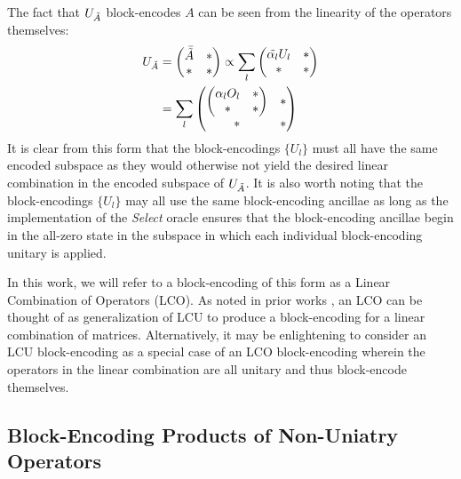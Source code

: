 The fact that $U_{\Tilde{A}}$ block-encodes $A$ can be seen from the linearity of the operators themselves:
\begin{equation}
    \begin{split}
        U_{\Tilde{A}} &= 
        \begin{pmatrix}
        \bar{\Tilde{A}} & * \\
        * & * 
        \end{pmatrix} \propto
        \sum_{l}
        \begin{pmatrix}
        \Tilde{\alpha_l} U_l & * \\
        * & * 
        \end{pmatrix} \\
        & =\sum_{l}
        \begin{pmatrix}
        \begin{pmatrix}
            \alpha_l O_l & * \\
            * & * 
        \end{pmatrix} & * \\
        * & * 
        \end{pmatrix} 
    \end{split}
\end{equation}
It is clear from this form that the block-encodings $\{U_l\}$ must all have the same encoded subspace as they would otherwise not yield the desired linear combination in the encoded subspace of $U_{\Tilde{A}}$.
It is also worth noting that the block-encodings $\{U_l\}$ may all use the same block-encoding ancillae as long as the implementation of the \textit{Select} oracle ensures that the block-encoding ancillae begin in the all-zero state in the subspace in which each individual block-encoding unitary is applied.

In this work, we will refer to a block-encoding of this form as a Linear Combination of Operators (LCO).
As noted in prior works \cite{berry2015simulating, childs2017quantum, gilyen2019quantum, lin2022lecture, jennings2023efficient}, an LCO can be thought of as generalization of LCU to produce a block-encoding for a linear combination of matrices.
Alternatively, it may be enlightening to consider an LCU block-encoding as a special case of an LCO block-encoding wherein the operators in the linear combination are all unitary and thus block-encode themselves.

\subsection{Block-Encoding Products of Non-Uniatry Operators}
\label{subsec:be-products}

